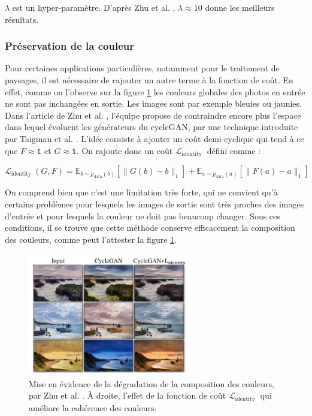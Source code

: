 $\lambda$ est un hyper-paramètre. D'après Zhu et al. \cite{zhu_unpaired_2018}, $\lambda \approx 10$ donne les meilleurs résultats.

\subsubsection{Préservation de la couleur}

Pour certaines applications particulières, notamment pour le traitement de paysages, il est nécessaire de rajouter un autre terme à la fonction de coût. En effet, comme on l'observe sur la figure \ref{Lident} les couleurs globales des photos en entrée ne sont pas inchangées en sortie. Les images sont par exemple bleuies ou  jaunies. Dans l'article de Zhu et al. \cite{zhu_unpaired_2018}, l'équipe propose de contraindre encore plus l'espace dans lequel évoluent les générateurs du cycleGAN, par une technique introduite par Taigman et al. \cite{taigman_unsupervised_2016}. L'idée consiste à ajouter un coût demi-cyclique qui tend à ce que $ F \approx \mathbb{1} $ et $ G \approx \mathbb{1} $. On rajoute donc un coût $\mathcal{L}_{\text {identity }}$ défini comme :

$$\mathcal{L}_{\text {identity }}(G, F)=\mathbb{E}_{b \sim p_{\text {data}}(b)}\left[\|G(b)-b\|_{1}\right]+ \mathbb{E}_{a \sim p_{\text {data}}(a)}\left[\|F(a)-a\|_{1}\right]$$

On comprend bien que c'est une limitation très forte, qui ne convient qu'à certains problèmes pour lesquels les images de sortie sont très proches des images d'entrée et pour lesquels la couleur ne doit pas beaucoup changer. Sous ces conditions, il se trouve que cette méthode conserve efficacement la composition des couleurs, comme peut l'attester la figure \ref{Lident}. 

\begin{figure}[!h]
\centering
\includegraphics[width=200pt]{"images/cycle/Lident"}
\caption{Mise en évidence de la dégradation de la composition des couleurs, par Zhu et al. \cite{zhu_unpaired_2018}. À droite, l'effet de la fonction de coût $\mathcal{L}_{\text {identity }}$ qui améliore la cohérence des couleurs.}
\label{Lident}
\end{figure}


